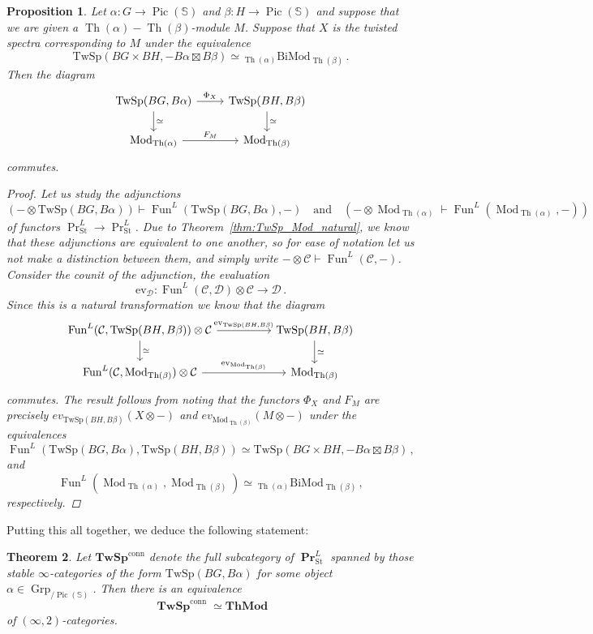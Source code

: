 \documentclass[10pt]{amsart}
\theoremstyle{plain}
\newtheorem{theorem}{Theorem}[subsection]
\newtheorem{proposition}[theorem]{Proposition}
\theoremstyle{definition}
\DeclareMathOperator{\Mod}{Mod}
\DeclareMathOperator{\Grp}{Grp}
\DeclareMathOperator{\Fun}{Fun}
\DeclareMathOperator{\Th}{Th}
\DeclareMathOperator{\Pic}{Pic}
\DeclareMathOperator{\PPr}{\mathbf{Pr}}
\DeclareMathOperator{\TTwSp}{\mathbf{TwSp}}
\newcommand{\St}{\mathrm{St}}
\newcommand{\bS}{\mathbb{S}}
\newcommand{\cC}{\mathcal{C}}
\newcommand{\calD}{\mathcal{D}}
\newcommand{\TwSp}{\mathrm{TwSp}}
\newcommand{\och}{\quad \text{and} \quad}
\begin{document}
\begin{proposition}
  Let $\alpha : G \to \Pic(\bS)$ and $\beta : H \to \Pic(\bS)$ and suppose that we are given a $\Th(\alpha) - \Th(\beta)$-module $M$. Suppose that  $X$ is the twisted spectra corresponding to $M$ under the equivalence
  \[
  \TwSp(BG \times BH , -B\alpha \boxtimes B\beta) \simeq {}_{\Th(\alpha)} \mathrm{BiMod}_{\Th(\beta)} \,.
  \]
  Then the diagram
  \[
  \begin{tikzcd}
  \TwSp(BG, B\alpha) \arrow[r,"\Phi_X"] \arrow[d,"\simeq"] & \TwSp(BH,B\beta) \arrow[d,"\simeq"] \\
  \Mod_{\Th(\alpha)}  \arrow[r,"F_M"] & \Mod_{\Th(\beta)}
\end{tikzcd}
  \]
  commutes.
  \begin{proof}
    Let us study the adjunctions
    \[
    (- \otimes \TwSp(BG,B\alpha)) \vdash \Fun^L(\TwSp(BG,B\alpha),-) \och (- \otimes \Mod_{\Th(\alpha)} \vdash \Fun^L(\Mod_{\Th(\alpha)},-))
    \]
    of functors $\Pr^{L}_{\St} \to \Pr^{L}_{\St}$.
    Due to Theorem~\ref{thm:TwSp_Mod_natural}, we know that these adjunctions are equivalent to one another, so for ease of notation let us not make a distinction between them, and simply write $- \otimes \cC \vdash \Fun^L(\cC,-)$.
    Consider the counit of the adjunction, the evaluation
    \[
    \mathrm{ev}_{\mathcal{D}} :\Fun^L(\cC,\calD) \otimes  \cC \to \calD \,.
    \]
    Since this is a natural transformation we know that the diagram
    \[
    \begin{tikzcd}[column sep = huge]
    \Fun^L(\cC,\TwSp(BH,B\beta)) \otimes \cC \arrow[r,"\mathrm{ev}_{\TwSp(BH,B\beta)}"] \arrow[d,"\simeq"] & \TwSp(BH,B\beta) \arrow[d,"\simeq"] \\
    \Fun^L(\cC,\Mod_{\Th(\beta)}) \otimes \cC  \arrow[r,"\mathrm{ev}_{\Mod_{\Th(\beta)}}"] & \Mod_{\Th(\beta)}
    \end{tikzcd}
    \]
    commutes.
    The result follows from noting that the functors $\Phi_X$ and $F_M$ are precisely $ev_{\TwSp(BH,B\beta)}(X \otimes -)$ and $ev_{\Mod_{\Th(\beta)}}(M \otimes -)$ under the equivalences
    \[
    \Fun^{L}(\TwSp(BG,B\alpha),\TwSp(BH,B\beta)) \simeq \TwSp(BG \times BH , -B\alpha \boxtimes B \beta) \,,
    \]
    and
    \[
    \Fun^L(\Mod_{\Th(\alpha)},\Mod_{\Th(\beta)}) \simeq {}_{\Th(\alpha)} \mathrm{BiMod}_{\Th(\beta)} \,,
    \]
    respectively.
  \end{proof}
\end{proposition}

\noindent Putting this all together, we deduce the following statement:
\begin{theorem}
  Let $\mathbf{TwSp}^{\mathrm{conn}}$ denote the full subcategory of $\PPr_{\St}^L$ spanned by those stable $\infty$-categories of the form $\TwSp(BG,B\alpha)$ for some object $\alpha \in \Grp_{/\Pic(\bS)}$.
  Then there is an equivalence
  \[
  \TTwSp^{\mathrm{conn}} \simeq \mathbf{ThMod}
  \]
  of $(\infty,2)$-categories.
\end{theorem}
\end{document}
